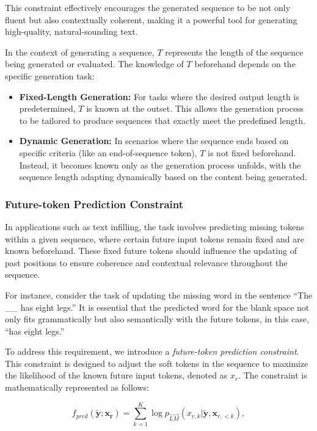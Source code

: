 \documentclass{article}
\begin{document}
This constraint effectively encourages the generated sequence to be not only fluent but also contextually coherent, making it a powerful tool for generating high-quality, natural-sounding text.

In the context of generating a sequence, \(T\) represents the length of the sequence being generated or evaluated. The knowledge of \(T\) beforehand depends on the specific generation task:

\begin{itemize}
    \item \textbf{Fixed-Length Generation:} For tasks where the desired output length is predetermined, \(T\) is known at the outset. This allows the generation process to be tailored to produce sequences that exactly meet the predefined length.

    \item \textbf{Dynamic Generation:} In scenarios where the sequence ends based on specific criteria (like an end-of-sequence token), \(T\) is not fixed beforehand. Instead, it becomes known only as the generation process unfolds, with the sequence length adapting dynamically based on the content being generated.
\end{itemize}

\subsubsection{Future-token Prediction Constraint}
In applications such as text infilling, the task involves predicting missing tokens within a given sequence, where certain future input tokens remain fixed and are known beforehand. These fixed future tokens should influence the updating of past positions to ensure coherence and contextual relevance throughout the sequence.

For instance, consider the task of updating the missing word in the sentence ``The \_\_ has eight legs.'' It is essential that the predicted word for the blank space not only fits grammatically but also semantically with the future tokens, in this case, ``has eight legs.''

To address this requirement, we introduce a \emph{future-token prediction constraint}. This constraint is designed to adjust the soft tokens in the sequence to maximize the likelihood of the known future input tokens, denoted as \(x_r\). The constraint is mathematically represented as follows:

\begin{equation}
    f_{pred}(\mathbf{\tilde{y}}; \mathbf{x_r}) = \sum_{k=1}^{K} \log {p}_{\overrightarrow{LM}}({x_{r,k}}|\mathbf{\tilde{y}}, {\mathbf{x}_{r,<k}}),
\end{equation}
\end{document}
